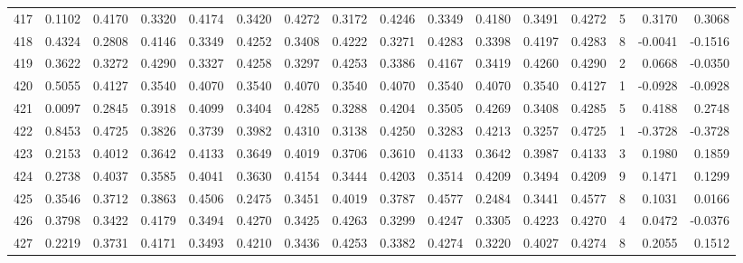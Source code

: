 \begin{tabular}{lrrrrrrrrrrrrrrr}
417 &      0.1102 &  0.4170 &  0.3320 &  0.4174 &  0.3420 &  0.4272 &  0.3172 &  0.4246 &  0.3349 &  0.4180 &   0.3491 &     0.4272 &      5 &                    0.3170 &                     0.3068 \\
418 &      0.4324 &  0.2808 &  0.4146 &  0.3349 &  0.4252 &  0.3408 &  0.4222 &  0.3271 &  0.4283 &  0.3398 &   0.4197 &     0.4283 &      8 &                   -0.0041 &                    -0.1516 \\
419 &      0.3622 &  0.3272 &  0.4290 &  0.3327 &  0.4258 &  0.3297 &  0.4253 &  0.3386 &  0.4167 &  0.3419 &   0.4260 &     0.4290 &      2 &                    0.0668 &                    -0.0350 \\
420 &      0.5055 &  0.4127 &  0.3540 &  0.4070 &  0.3540 &  0.4070 &  0.3540 &  0.4070 &  0.3540 &  0.4070 &   0.3540 &     0.4127 &      1 &                   -0.0928 &                    -0.0928 \\
421 &      0.0097 &  0.2845 &  0.3918 &  0.4099 &  0.3404 &  0.4285 &  0.3288 &  0.4204 &  0.3505 &  0.4269 &   0.3408 &     0.4285 &      5 &                    0.4188 &                     0.2748 \\
422 &      0.8453 &  0.4725 &  0.3826 &  0.3739 &  0.3982 &  0.4310 &  0.3138 &  0.4250 &  0.3283 &  0.4213 &   0.3257 &     0.4725 &      1 &                   -0.3728 &                    -0.3728 \\
423 &      0.2153 &  0.4012 &  0.3642 &  0.4133 &  0.3649 &  0.4019 &  0.3706 &  0.3610 &  0.4133 &  0.3642 &   0.3987 &     0.4133 &      3 &                    0.1980 &                     0.1859 \\
424 &      0.2738 &  0.4037 &  0.3585 &  0.4041 &  0.3630 &  0.4154 &  0.3444 &  0.4203 &  0.3514 &  0.4209 &   0.3494 &     0.4209 &      9 &                    0.1471 &                     0.1299 \\
425 &      0.3546 &  0.3712 &  0.3863 &  0.4506 &  0.2475 &  0.3451 &  0.4019 &  0.3787 &  0.4577 &  0.2484 &   0.3441 &     0.4577 &      8 &                    0.1031 &                     0.0166 \\
426 &      0.3798 &  0.3422 &  0.4179 &  0.3494 &  0.4270 &  0.3425 &  0.4263 &  0.3299 &  0.4247 &  0.3305 &   0.4223 &     0.4270 &      4 &                    0.0472 &                    -0.0376 \\
427 &      0.2219 &  0.3731 &  0.4171 &  0.3493 &  0.4210 &  0.3436 &  0.4253 &  0.3382 &  0.4274 &  0.3220 &   0.4027 &     0.4274 &      8 &                    0.2055 &                     0.1512 \\

\end{tabular}
